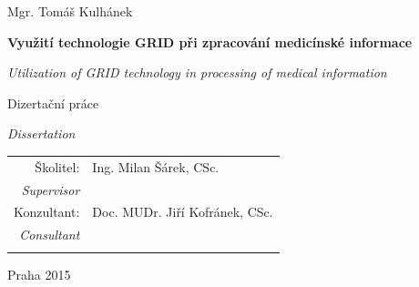 \begin{center}
{\Large Mgr. Tomáš Kulhánek}

\vspace{8mm}

\textbf{\large Využití technologie GRID při zpracování medicínské informace}

\vspace{2mm}
\textit{\large Utilization of GRID technology in processing of medical information}

\vfill



{\Large Dizertační práce}

\textit{\large Dissertation}

\vfill


\begin{tabular}{rl}

Školitel: & Ing. Milan Šárek, CSc. \\
\noalign{\vspace{-1mm}}
\textit{Supervisor} \\
\noalign{\vspace{2mm}}
Konzultant: & Doc. MUDr. Jiří Kofránek, CSc. \\
\noalign{\vspace{-1mm}}
\textit{Consultant} \\
\noalign{\vspace{2mm}}
\end{tabular}

\vfill

Praha 2015

\end{center}
\newpage
\mbox{}
